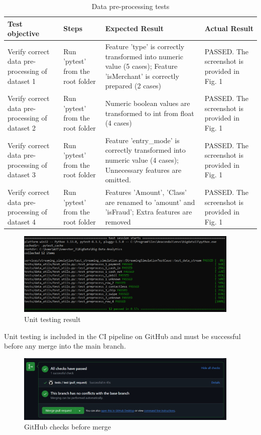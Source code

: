 \documentclass[12pt,a4paper, hidelinks]{article}
\begin{document}
\begin{table}[htbp]
\centering
\begin{tabular}{|p{3cm}|p{4cm}|p{4cm}|p{5cm}|}
\hline
\textbf{Test objective} & \textbf{Steps} & \textbf{Expected Result} & \textbf{Actual Result} \\
\hline
Verify correct data pre-processing of dataset 1 & Run 'pytest' from the root folder & Feature 'type' is correctly transformed into numeric value (5 cases); Feature 'isMerchant' is correctly prepared (2 cases) & PASSED. The screenshot is provided in Fig. 1 \\
\hline
Verify correct data pre-processing of dataset 2 & Run 'pytest' from the root folder & Numeric boolean values are transformed to int from float (4 cases) & PASSED. The screenshot is provided in Fig. 1 \\
\hline
Verify correct data pre-processing of dataset 3 & Run 'pytest' from the root folder & Feature 'entry\_mode' is correctly transformed into numeric value (4 cases); Unnecessary features are omitted. & PASSED. The screenshot is provided in Fig. 1 \\
\hline
Verify correct data pre-processing of dataset 4 & Run 'pytest' from the root folder & Features 'Amount', 'Class' are renamed to 'amount' and 'isFraud'; Extra features are removed & PASSED. The screenshot is provided in Fig. 1 \\
\hline
\end{tabular}
\caption{Data pre-processing tests}
\end{table}

\begin{figure}[htbp]
  \centering
  \includegraphics[width=0.95\textwidth]{images/unittests-M2.png}
  \caption{Unit testing result}
  \label{fig:sunset}
\end{figure}

Unit testing is included in the CI pipeline on GitHub and must be successful before any merge into the main branch.

\begin{figure}[htbp]
  \centering
  \includegraphics[width=0.95\textwidth]{images/github-checks-M2.PNG}
  \caption{GitHub checks before merge}
  \label{fig:sunset}
\end{figure}
\end{document}
